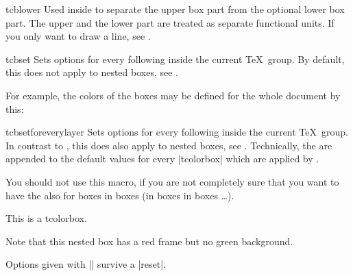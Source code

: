 \begin{docCommand}{tcblower}{}
  Used inside  to separate the upper box part from
  the optional lower box part. The upper and the lower part are treated
  as separate functional units. If you only want to draw a line, see
  .
\end{docCommand}


\clearpage
\begin{docCommand}{tcbset}{}
  Sets options for every following  inside the current \TeX\ group.
  By default, this does not apply to nested boxes, see .\par
  For example, the colors of the boxes may be defined for the whole document by this:
\begin{dispListing}
\end{dispListing}
\end{docCommand}


\begin{docCommand}{tcbsetforeverylayer}{}
  Sets options for every following  inside the current \TeX\ group.
  In contrast to , this does also
  apply to nested boxes, see .
  Technically, the  are appended to the default values for every
  |tcolorbox| which are applied by .\par
  You should not use this macro, if you are not completely sure that you
  want to have the  also for boxes in boxes (in boxes in boxes \ldots).
\begin{dispExample}

\begin{tcolorbox}[title=All options for this box]
  This is a tcolorbox.\par\medskip
  \begin{tcolorbox}[title=Nested box]
    Note that this nested box has a red frame but no green background.
  \end{tcolorbox}
\end{tcolorbox}
\bigskip

\begin{tcolorbox}[reset]
  Options given with |\tcbsetforeverylayer| survive a |reset|.
\end{tcolorbox}
\end{dispExample}
\end{docCommand}


